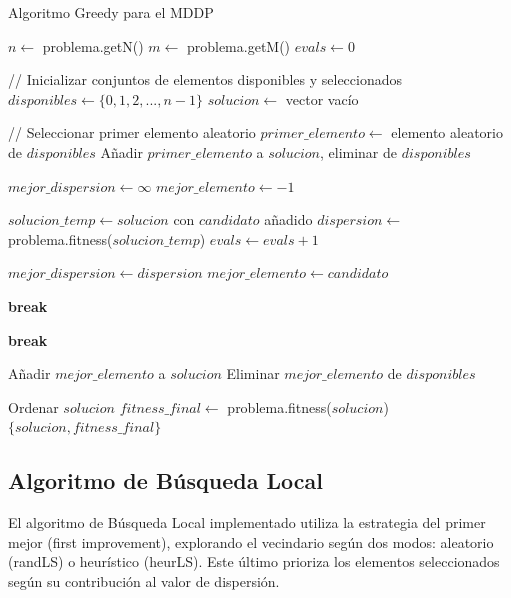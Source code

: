 \documentclass{article}
\begin{document}
\begin{algorithm}
\caption{Algoritmo Greedy para el MDDP}
\begin{algorithmic}[1]
    \State $n \gets$ problema.getN()
    \State $m \gets$ problema.getM()
    \State $evals \gets 0$
    
    \State // Inicializar conjuntos de elementos disponibles y seleccionados
    \State $disponibles \gets \{0, 1, 2, ..., n-1\}$ 
    \State $solucion \gets$ vector vacío
    
    \State // Seleccionar primer elemento aleatorio
    \State $primer\_elemento \gets$ elemento aleatorio de $disponibles$
    \State Añadir $primer\_elemento$ a $solucion$, eliminar de $disponibles$
    
        \State $mejor\_dispersion \gets \infty$
        \State $mejor\_elemento \gets -1$
        
            \State $solucion\_temp \gets solucion$ con $candidato$ añadido
            \State $dispersion \gets$ problema.fitness($solucion\_temp$)
            \State $evals \gets evals + 1$
            
                \State $mejor\_dispersion \gets dispersion$
                \State $mejor\_elemento \gets candidato$
            \EndIf
            
             \textbf{break} \EndIf
        \EndFor
        
         \textbf{break} \EndIf
        
        \State Añadir $mejor\_elemento$ a $solucion$
        \State Eliminar $mejor\_elemento$ de $disponibles$
    \EndWhile
    
    \State Ordenar $solucion$
    \State $fitness\_final \gets$ problema.fitness($solucion$)
    \State \Return $\{solucion, fitness\_final\}$
\EndFunction
\end{algorithmic}
\end{algorithm}

\newpage

\subsection{Algoritmo de Búsqueda Local}

El algoritmo de Búsqueda Local implementado utiliza la estrategia del primer mejor (first improvement), explorando el vecindario según dos modos: aleatorio (randLS) o heurístico (heurLS). Este último prioriza los elementos seleccionados según su contribución al valor de dispersión.
\end{document}
